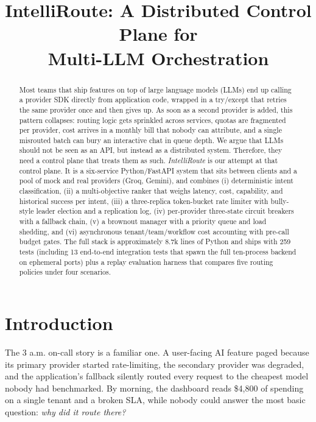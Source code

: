 \documentclass[conference,letterpaper]{IEEEtran}
\begin{document}
\title{IntelliRoute: A Distributed Control Plane for\\
       Multi-LLM Orchestration}

\author{
}

\maketitle

\begin{abstract}
Most teams that ship features on top of large language models (LLMs)
end up calling a provider SDK directly from application code, wrapped
in a try/except that retries the same provider once
and then gives up. As soon as a second provider is added, this pattern
collapses: routing logic gets sprinkled across services, quotas are
fragmented per provider, cost arrives in a monthly bill that nobody
can attribute, and a single misrouted batch can bury an interactive
chat in queue depth. We argue that LLMs should not be seen as an API, but instead as a distributed system. Therefore, they need a control plane
that treats them as such. \emph{IntelliRoute} is our attempt at that
control plane. It is a six-service Python/FastAPI system that sits
between clients and a pool of mock and real providers (Groq, Gemini),
and combines (i) deterministic intent classification, (ii) a
multi-objective ranker that weighs latency, cost, capability, and
historical success per intent, (iii) a three-replica token-bucket
rate limiter with bully-style leader election and a replication log,
(iv) per-provider three-state circuit breakers with a fallback chain,
(v) a brownout manager with a priority queue and load shedding, and
(vi) asynchronous tenant/team/workflow cost accounting with pre-call
budget gates. The full stack is approximately 8.7k lines of Python
and ships with 259 tests (including 13 end-to-end integration tests
that spawn the full ten-process backend on ephemeral ports) plus a
replay evaluation harness that compares five routing policies under
four scenarios.
\end{abstract}

\section{Introduction}
The 3 a.m. on-call story is a familiar one. A user-facing AI
feature paged because its primary provider started rate-limiting,
the secondary provider was degraded, and the application's fallback
silently routed every request to the cheapest model nobody had
benchmarked. By morning, the dashboard reads \$4,800 of spending on a
single tenant and a broken SLA, while nobody could answer the most
basic question: \emph{why did it route there?}
\end{document}
